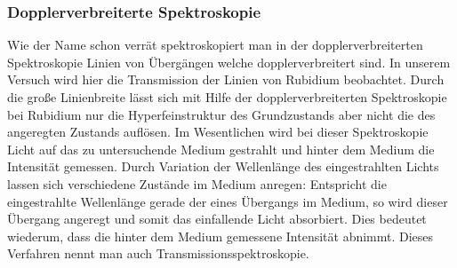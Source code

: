 \documentclass[12pt]{article}
\begin{document}
\subsubsection{Dopplerverbreiterte Spektroskopie}
Wie der Name schon verrät spektroskopiert man in der dopplerverbreiterten Spektroskopie Linien von Übergängen welche
dopplerverbreitert sind. In unserem Versuch wird hier die Transmission der Linien von Rubidium beobachtet. Durch die große
Linienbreite lässt sich mit Hilfe der dopplerverbreiterten Spektroskopie bei Rubidium nur die Hyperfeinstruktur des Grundzustands aber nicht die
des angeregten Zustands auflösen. Im Wesentlichen wird bei dieser Spektroskopie Licht auf das zu untersuchende Medium gestrahlt und hinter dem Medium die Intensität gemessen. Durch Variation der Wellenlänge des eingestrahlten Lichts lassen sich verschiedene Zustände im Medium anregen: Entspricht die eingestrahlte Wellenlänge gerade der eines Übergangs im Medium, so wird dieser Übergang angeregt und somit das einfallende Licht absorbiert. Dies bedeutet wiederum, dass die hinter dem Medium gemessene Intensität abnimmt. Dieses Verfahren nennt man auch Transmissionsspektroskopie.
\end{document}

